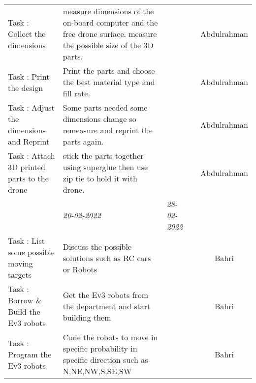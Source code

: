 \begin{center}
\begin{small}
\begin{xltabular}{\textwidth}{ p{3cm} p{5cm} X X c }
			Task \thesubcounter: 
			Collect the dimensions
			&  measure dimensions of the on-board computer 
			and the free drone surface. 
			measure the possible size of the 
			3D parts.
			& & & Abdulrahman \\
			
			Task \thesubcounter: 
			Print the design
			& Print the parts and choose the best material type and
			fill rate.
			& & & Abdulrahman \\
			
			Task \thesubcounter: 
			Adjust the dimensions and Reprint
			& Some parts needed some dimensions change
			so remeasure and reprint the parts again. 
			& & & Abdulrahman \\
			
			Task \thesubcounter: 
			Attach 3D printed parts to the drone
			& stick the parts together using superglue
			then use zip tie to hold it with drone. 
			& & & Abdulrahman \\                
			
			\addlinespace
			& \emph{20-02-2022} & \emph{28-02-2022} & 
			\\ \addlinespace
			
			Task \thesubcounter: 
			List some possible moving targets
			& Discuss the possible solutions such
			as RC cars or Robots
			& & & Bahri \\
			
			Task \thesubcounter: 
			Borrow \& Build the Ev3 robots
			& Get the Ev3 robots from the department
			and start building them
			& & & Bahri \\
			
			Task \thesubcounter: 
			Program the Ev3 robots
			& Code the robots to move in
			specific probability in specific direction
			such as N,NE,NW,S,SE,SW
			& & & Bahri \\
			
			\bottomrule
		\end{xltabular}
	\end{small}
\end{center}

